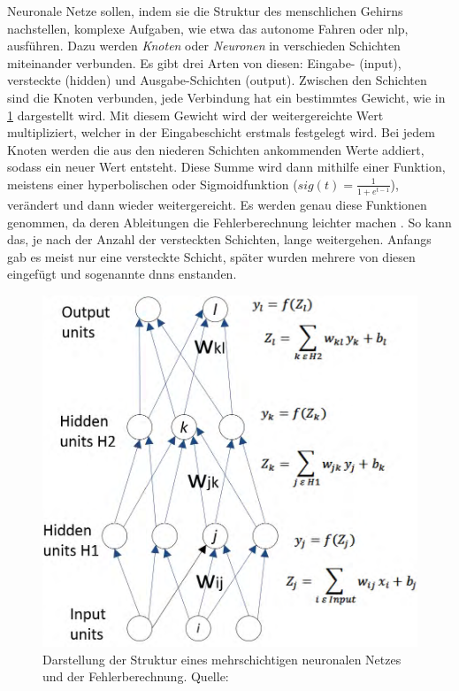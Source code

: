 Neuronale Netze sollen, indem sie die Struktur des menschlichen Gehirns nachstellen, komplexe Aufgaben, wie etwa das autonome Fahren oder \acl{nlp}, ausführen.
Dazu werden \emph{Knoten} oder \emph{Neuronen} in verschieden Schichten miteinander verbunden.
Es gibt drei Arten von diesen: Eingabe- (input), versteckte (hidden) und Ausgabe-Schichten (output).
Zwischen den Schichten sind die Knoten verbunden, jede Verbindung hat ein bestimmtes Gewicht, wie in \cref{fig:struktur-nn} dargestellt wird.
Mit diesem Gewicht wird der weitergereichte Wert multipliziert, welcher in der Eingabeschicht erstmals festgelegt wird.
Bei jedem Knoten werden die aus den niederen Schichten ankommenden Werte addiert, sodass ein neuer Wert entsteht.
Diese Summe wird dann mithilfe einer Funktion, meistens einer hyperbolischen oder Sigmoidfunktion ($sig(t)=\frac{1}{1+e^{t-1}}$), verändert und dann wieder weitergereicht.
Es werden genau diese Funktionen genommen, da deren Ableitungen die Fehlerberechnung leichter machen \citep{deeplearningnature}.
So kann das, je nach der Anzahl der versteckten Schichten, lange weitergehen.
Anfangs gab es meist nur eine versteckte Schicht, später wurden mehrere von diesen eingefügt und sogenannte \aclp{dnn} enstanden.
\begin{figure}%
\centering
\includegraphics[width=.8\textwidth, height=.9\textheight, keepaspectratio]{Images/NeuralNetwork.png}
\caption[Struktur von DNNs]{Darstellung der Struktur eines mehrschichtigen neuronalen Netzes und der Fehlerberechnung. Quelle: \citet{deeplearningarchitecturesreview}}
\label{fig:struktur-nn}
\end{figure}

